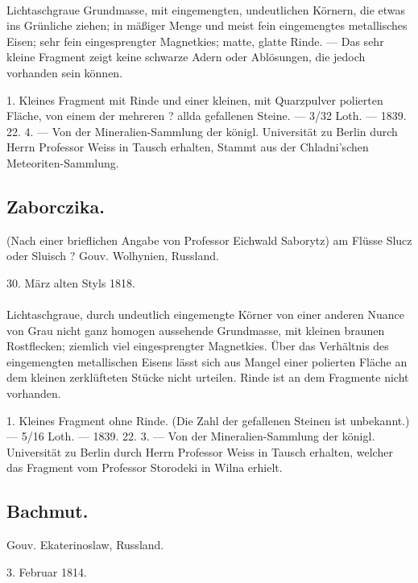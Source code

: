 \documentclass[a4paper, 11pt, oneside, polutonikogreek, german]{article}
\begin{document}
\paragraph{}
Lichtaschgraue Grundmasse, mit eingemengten, undeutlichen Körnern, die etwas ins Grünliche ziehen; in mäßiger Menge und meist fein eingemengtes metallisches Eisen; sehr fein eingesprengter Magnetkies; matte, glatte Rinde. — Das sehr kleine Fragment zeigt keine schwarze Adern oder Ablösungen, die jedoch vorhanden sein können.

1. Kleines Fragment mit Rinde und einer kleinen, mit Quarzpulver polierten Fläche, von einem der mehreren ? allda gefallenen Steine. — 3/32 Loth. — 1839. 22. 4. — Von der Mineralien-Sammlung der königl. Universität zu Berlin durch Herrn Professor Weiss in Tausch erhalten, Stammt aus der Chladni'schen Meteoriten-Sammlung.
\subsection{Zaborczika.}
\begin{center}
\small
(Nach einer brieflichen Angabe von Professor Eichwald Saborytz) am Flüsse Slucz oder Sluisch ? Gouv. Wolhynien, Russland.

30. März alten Styls 1818.
\end{center}
\paragraph{}
Lichtaschgraue, durch undeutlich eingemengte Körner von einer anderen Nuance von Grau nicht ganz homogen aussehende Grundmasse, mit kleinen braunen Rostflecken; ziemlich viel eingesprengter Magnetkies. Über das Verhältnis des eingemengten metallischen Eisens lässt sich aus Mangel einer polierten Fläche an dem kleinen zerklüfteten Stücke nicht urteilen. Rinde ist an dem Fragmente nicht vorhanden.

1. Kleines Fragment ohne Rinde. (Die Zahl der gefallenen Steinen ist unbekannt.) — 5/16 Loth. — 1839. 22. 3. — Von der Mineralien-Sammlung der königl. Universität zu Berlin durch Herrn Professor Weiss in Tausch erhalten, welcher das Fragment vom Professor Storodeki in Wilna erhielt.
\subsection{Bachmut.}
\begin{center}
\small
Gouv. Ekaterinoslaw, Russland.

3. Februar 1814.
\end{center}
\end{document}
